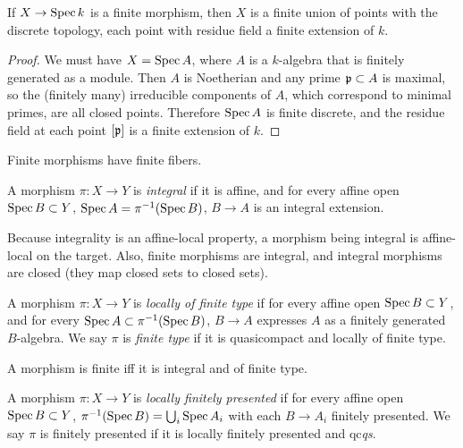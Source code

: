 \documentclass[11pt]{amsart}
\begin{document}
\begin{prop}[7.3.H]
If $X\to \operatorname{Spec} k$ is a finite morphism, then $X$ is a finite union of points with the discrete topology, each point with residue field a finite extension of $k$.
\end{prop}

\begin{proof}
We must have $X = \operatorname{Spec} A$, where $A$ is a $k$-algebra that is finitely generated as a module. Then $A$ is Noetherian and any prime $\mathfrak{p}\subset A$ is maximal, so the (finitely many) irreducible components of $A$, which correspond to minimal primes, are all closed points. Therefore $\operatorname{Spec} A$ is finite discrete, and the residue field at each point $[\mathfrak{p}]$ is a finite extension of $k$.
\end{proof}

\begin{cor}[7.3.K]
Finite morphisms have finite fibers.
\end{cor}

\begin{defn}
A morphism $\pi:X\to Y$ is \emph{integral} if it is affine, and for every affine open $\operatorname{Spec} B \subset Y$, $\operatorname{Spec} A = \pi^{-1}(\operatorname{Spec} B)$, $B\to A$ is an integral extension.
\end{defn}

Because integrality is an affine-local property, a morphism being integral is affine-local on the target. Also, finite morphisms are integral, and integral morphisms are closed (they map closed sets to closed sets).

\begin{defn}
A morphism $\pi:X\to Y$ is \emph{locally of finite type} if for every affine open $\operatorname{Spec} B \subset Y$, and for every $\operatorname{Spec} A \subset \pi^{-1}(\operatorname{Spec} B)$, $B\to A$ expresses $A$ as a finitely generated $B$-algebra. We say $\pi$ is \emph{finite type} if it is quasicompact and locally of finite type.
\end{defn}

\begin{prop}[7.3.P]
A morphism is finite iff it is integral and of finite type.
\end{prop}

\begin{defn}
A morphism $\pi: X\to Y$ is \emph{locally finitely presented} if for every affine open $\operatorname{Spec} B \subset Y$, $\pi^{-1}(\operatorname{Spec} B) = \bigcup_i \operatorname{Spec} A_i$ with each $B\to A_i$ finitely presented. We say $\pi$ is finitely presented if it is locally finitely presented and qc\emph{qs}.
\end{defn}
\end{document}
